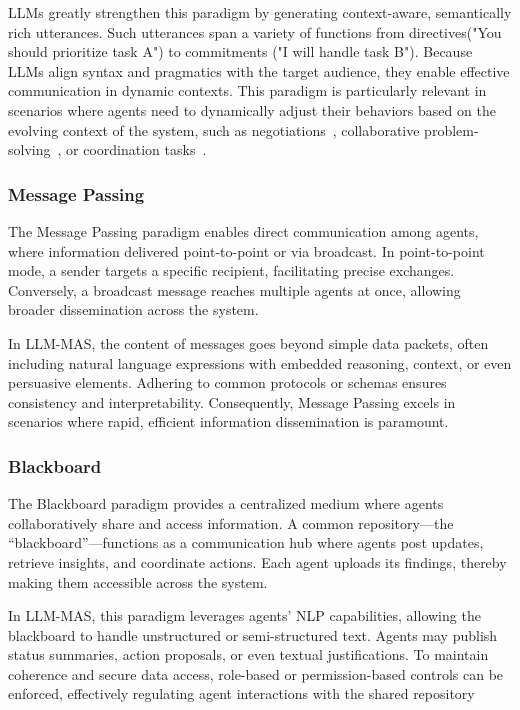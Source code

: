 LLMs greatly strengthen this paradigm by generating context-aware, semantically rich utterances. Such utterances span a variety of functions from directives("You should prioritize task A") to commitments ("I will handle task B"). Because LLMs align syntax and pragmatics with the target audience, they enable effective communication in dynamic contexts. This paradigm is particularly relevant in scenarios where agents need to dynamically adjust their behaviors based on the evolving context of the system, such as negotiations~\cite{polca_mas_for_political,richeliey_diplomacy_society}, collaborative problem-solving~\cite{debate_improve_llm_1}, or coordination tasks~\cite{chatdev_software_development}. 

\subsubsection{Message Passing}
The Message Passing paradigm enables direct communication among agents, where information delivered point-to-point or via broadcast. In point-to-point mode, a sender targets a specific recipient, facilitating precise exchanges. Conversely, a broadcast message reaches multiple agents at once, allowing broader dissemination across the system.

In LLM-MAS, the content of messages goes beyond simple data packets, often including natural language expressions with embedded reasoning, context, or even persuasive elements. Adhering to common protocols or schemas ensures consistency and interpretability. Consequently, Message Passing excels in scenarios where rapid, efficient information dissemination is paramount.

\subsubsection{Blackboard}
The Blackboard paradigm provides a centralized medium where agents collaboratively share and access information. A common repository—the “blackboard”—functions as a communication hub where agents post updates, retrieve insights, and coordinate actions. Each agent uploads its findings, thereby making them accessible across the system.

In LLM-MAS,  this paradigm leverages agents’ NLP capabilities, allowing the blackboard to handle unstructured or semi-structured text. Agents may publish status summaries, action proposals, or even textual justifications. To maintain coherence and secure data access, role-based or permission-based controls can be enforced, effectively regulating agent interactions with the shared repository

